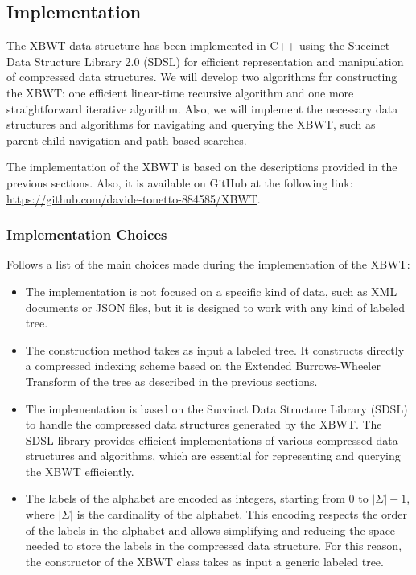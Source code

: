 \subsection{Implementation}
The XBWT data structure has been implemented in C++ using the Succinct Data Structure Library 2.0 (SDSL) for efficient representation and manipulation of compressed data structures. We will develop two algorithms for constructing the XBWT: one efficient linear-time recursive algorithm and one more straightforward iterative algorithm. Also, we will implement the necessary data structures and algorithms for navigating and querying the XBWT, such as parent-child navigation and path-based searches. 

The implementation of the XBWT is based on the descriptions provided in the previous sections. Also, it is available on GitHub at the following link: \url{https://github.com/davide-tonetto-884585/XBWT}.

\subsubsection{Implementation Choices}
Follows a list of the main choices made during the implementation of the XBWT:
\begin{itemize}
    \item The implementation is not focused on a specific kind of data, such as XML documents or JSON files, but it is designed to work with any kind of labeled tree. 
    \item The construction method takes as input a labeled tree. It constructs directly a compressed indexing scheme based on the Extended Burrows-Wheeler Transform of the tree as described in the previous sections.
    \item The implementation is based on the Succinct Data Structure Library (SDSL) to handle the compressed data structures generated by the XBWT. The SDSL library provides efficient implementations of various compressed data structures and algorithms, which are essential for representing and querying the XBWT efficiently.
    \item The labels of the alphabet are encoded as integers, starting from 0 to $|\Sigma| - 1$, where $|\Sigma|$ is the cardinality of the alphabet. This encoding respects the order of the labels in the alphabet and allows simplifying and reducing the space needed to store the labels in the compressed data structure. For this reason, the constructor of the XBWT class takes as input a generic labeled tree.
\end{itemize}

